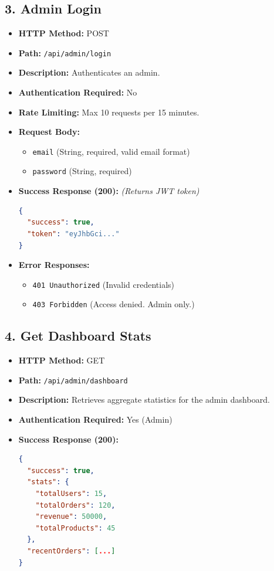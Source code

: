 \documentclass[12pt,a4paper]{article}
\begin{document}
\subsection{3. Admin Login}
\begin{itemize}
    \item \textbf{HTTP Method:} POST
    \item \textbf{Path:} \texttt{/api/admin/login}
    \item \textbf{Description:} Authenticates an admin.
    \item \textbf{Authentication Required:} No
    \item \textbf{Rate Limiting:} Max 10 requests per 15 minutes.
    \item \textbf{Request Body:}
    \begin{itemize}
        \item \texttt{email} (String, required, valid email format)
        \item \texttt{password} (String, required)
    \end{itemize}
    \item \textbf{Success Response (200):} \textit{(Returns JWT token)}
\begin{lstlisting}[language=json]
{
  "success": true,
  "token": "eyJhbGci..."
}
\end{lstlisting}
    \item \textbf{Error Responses:}
    \begin{itemize}
        \item \texttt{401 Unauthorized} (Invalid credentials)
        \item \texttt{403 Forbidden} (Access denied. Admin only.)
    \end{itemize}
\end{itemize}

\subsection{4. Get Dashboard Stats}
\begin{itemize}
    \item \textbf{HTTP Method:} GET
    \item \textbf{Path:} \texttt{/api/admin/dashboard}
    \item \textbf{Description:} Retrieves aggregate statistics for the admin dashboard.
    \item \textbf{Authentication Required:} Yes (Admin)
    \item \textbf{Success Response (200):}
\begin{lstlisting}[language=json]
{
  "success": true,
  "stats": {
    "totalUsers": 15,
    "totalOrders": 120,
    "revenue": 50000,
    "totalProducts": 45
  },
  "recentOrders": [...]
}
\end{lstlisting}
\end{itemize}
\end{document}
